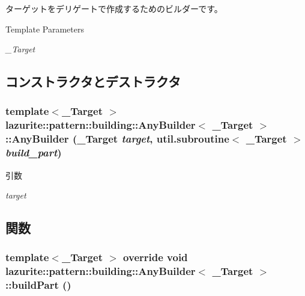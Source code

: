 ターゲットをデリゲートで作成するためのビルダーです。 
\begin{DoxyTemplParams}{Template Parameters}
\item[{\em \_\-Target}]\end{DoxyTemplParams}


\subsection{コンストラクタとデストラクタ}
\hypertarget{classlazurite_1_1pattern_1_1building_1_1_any_builder_3_01___target_01_4_af0df2b6bcac7f0b4330e189504f2e747}{
\subsubsection[{AnyBuilder}]{\setlength{\rightskip}{0pt plus 5cm}template$<$\_\-Target $>$ lazurite::pattern::building::AnyBuilder$<$ \_\-Target $>$::AnyBuilder (\_\-Target {\em target}, \/  util.subroutine$<$ \_\-Target $>$ {\em build\_\-part})}}
\label{classlazurite_1_1pattern_1_1building_1_1_any_builder_3_01___target_01_4_af0df2b6bcac7f0b4330e189504f2e747}

\begin{DoxyParams}{引数}
\item[{\em target}]\end{DoxyParams}


\subsection{関数}
\hypertarget{classlazurite_1_1pattern_1_1building_1_1_any_builder_3_01___target_01_4_a3c1f83ce10e846f83ab8f91d0a82300a}{
\subsubsection[{buildPart}]{\setlength{\rightskip}{0pt plus 5cm}template$<$\_\-Target $>$ override void lazurite::pattern::building::AnyBuilder$<$ \_\-Target $>$::buildPart ()}}
\label{classlazurite_1_1pattern_1_1building_1_1_any_builder_3_01___target_01_4_a3c1f83ce10e846f83ab8f91d0a82300a}


